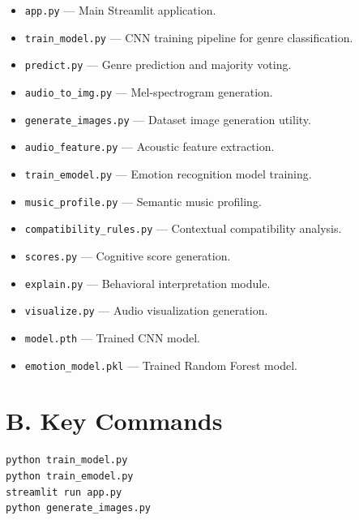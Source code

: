 \documentclass[12pt,a4paper]{report}
\begin{document}
\begin{itemize}

\item \texttt{app.py} --- Main Streamlit application.

\item \texttt{train\_model.py} --- CNN training pipeline for genre classification.

\item \texttt{predict.py} --- Genre prediction and majority voting.

\item \texttt{audio\_to\_img.py} --- Mel-spectrogram generation.

\item \texttt{generate\_images.py} --- Dataset image generation utility.

\item \texttt{audio\_feature.py} --- Acoustic feature extraction.

\item \texttt{train\_emodel.py} --- Emotion recognition model training.

\item \texttt{music\_profile.py} --- Semantic music profiling.

\item \texttt{compatibility\_rules.py} --- Contextual compatibility analysis.

\item \texttt{scores.py} --- Cognitive score generation.

\item \texttt{explain.py} --- Behavioral interpretation module.

\item \texttt{visualize.py} --- Audio visualization generation.

\item \texttt{model.pth} --- Trained CNN model.

\item \texttt{emotion\_model.pkl} --- Trained Random Forest model.

\end{itemize}

\section*{B. Key Commands}

\begin{verbatim}
python train_model.py
python train_emodel.py
streamlit run app.py
python generate_images.py
\end{verbatim}
\end{document}
